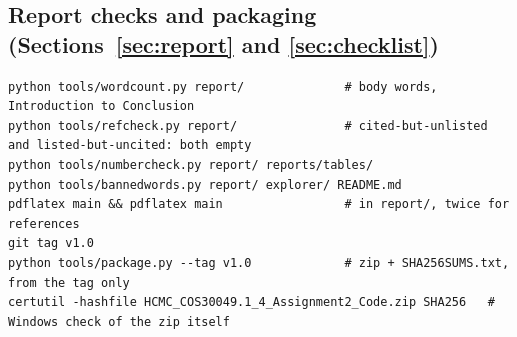 \subsection{Report checks and packaging (Sections~\ref{sec:report} and \ref{sec:checklist})}

\begin{lstlisting}
python tools/wordcount.py report/              # body words, Introduction to Conclusion
python tools/refcheck.py report/               # cited-but-unlisted and listed-but-uncited: both empty
python tools/numbercheck.py report/ reports/tables/
python tools/bannedwords.py report/ explorer/ README.md
pdflatex main && pdflatex main                 # in report/, twice for references
git tag v1.0
python tools/package.py --tag v1.0             # zip + SHA256SUMS.txt, from the tag only
certutil -hashfile HCMC_COS30049.1_4_Assignment2_Code.zip SHA256   # Windows check of the zip itself
\end{lstlisting}
